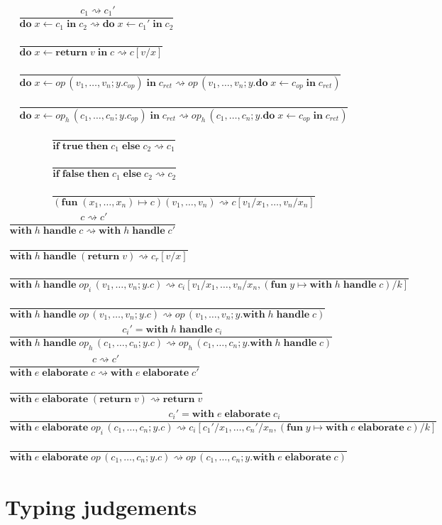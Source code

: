 \documentclass{article}
\newcommand\kw[1]{\mathbf{#1}}
\newcommand\true{\kw{true}}
\newcommand\false{\kw{false}}
\newcommand\fun[2]{\kw{fun}\; #1 \mapsto #2}
\newcommand\return[1]{\kw{return}\; #1}
\newcommand\opcall[4]{#1\,(#2; #3. #4)}
\newcommand\seq[3]{\kw{do}\;#1 \gets #2\;\kw{in}\;#3}
\newcommand\cond[3]{\kw{if}\;#1\;\kw{then}\;#2\;\kw{else}\;#3}
\newcommand\handle[2]{\kw{with}\;#1\;\kw{handle}\;#2}
\newcommand\elaborate[2]{\kw{with}\;#1\;\kw{elaborate}\;#2}
\newcommand\judgement[2]{\dfrac{\phantom{|}#1}{#2}}
\newcommand\step{\rightsquigarrow}
\begin{document}
\begin{gather*}
    \judgement{c_1\step c_1'}{\seq{x}{c_1}{c_2} \step \seq{x}{c_1'}{c_2}}\\
    \judgement{}{\seq{x}{\return{v}}{c} \step c[v/x]}\\
    \judgement{}{\seq{x}{
        \opcall{op}{v_1,\dots,v_n}{y}{c_{op}}}{c_{ret}}
        \step \opcall{op}{v_1,\dots,v_n}{y}{\seq{x}{c_{op}}{c_{ret}}}}\\
        \judgement{}{\seq{x}{
            \opcall{op_h}{c_1,\dots,c_n}{y}{c_{op}}}{c_{ret}}
            \step \opcall{op_h}{c_1,\dots,c_n}{y}{\seq{x}{c_{op}}{c_{ret}}}}
\end{gather*}
\begin{gather*}
    \judgement{}{\cond{\true}{c_1}{c_2} \step c_1}\\
    \judgement{}{\cond{\false}{c_1}{c_2} \step c_2}\\
    \judgement{}{(\fun{(x_1,\dots,x_n)}{c}) (v_1,\dots,v_n) \step c[v_1/x_1,\dots,v_n/x_n]}
\end{gather*}
\begin{gather*}
    \judgement{c \step c'}{\handle{h}{c} \step \handle{h}{c'}}\\
    \judgement{}{\handle{h}{(\return{v})} \step c_r[v/x] }\\
    \judgement{}{\handle{h}{\opcall{op_i}{v_1,\dots,v_n}{y}{c}}\step c_i[v_1/x_1,\dots,v_n/x_n, (\fun{y}{\handle{h}{c}})/k]}\\
    \judgement{}{\handle{h}\opcall{op}{v_1,\dots,v_n}{y}{c} \step \opcall{op}{v_1,\dots,v_n}{y}{\handle{h}{c}}}\\
    \judgement{
        c_i' = \handle{h}{c_i}
    }{
        \handle{h}\opcall{op_h}{c_1,\dots,c_n}{y}{c} \step \opcall{op_h}{c_1,\dots,c_n}{y}{\handle{h}{c}}
    }
\end{gather*}
\begin{gather*}
    \judgement{c \step c'}{\elaborate{e}{c} \step \elaborate{e}{c'}}\\
    \judgement{}{\elaborate{e}{(\return{v})} \step \return{v} }\\
    \judgement{
        c_i' = \elaborate{e}{c_i}
    }{\elaborate{e}{\opcall{op_i}{c_1,\dots,c_n}{y}{c}} \step c_i[c_1'/x_1,\dots,c_n'/x_n, (\fun{y}{\elaborate{e}{c}})/k]}\\
    \judgement{}{\elaborate{e}\opcall{op}{c_1,\dots,c_n}{y}{c} \step \opcall{op}{c_1,\dots,c_n}{y}{\elaborate{e}{c}}}
\end{gather*}

\section{Typing judgements}
\end{document}
